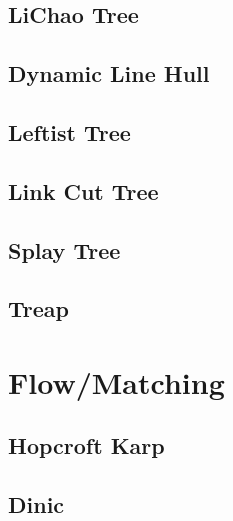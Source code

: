 \subsection{LiChao Tree}

\subsection{Dynamic Line Hull}

\subsection{Leftist Tree}

\subsection{Link Cut Tree}

%
%
%
\subsection{Splay Tree}

\subsection{Treap}


\section{Flow/Matching}
\subsection{Hopcroft Karp}

\subsection{Dinic}

